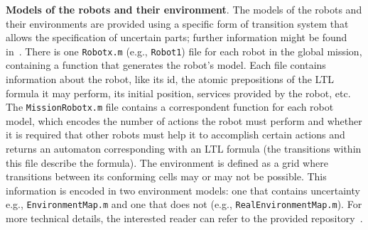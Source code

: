 \textbf{Models of the robots and their environment}. 
The models of the robots and their environments are provided using a specific form of transition system that allows the specification of uncertain parts; further information might be found in~\cite{menghi2018multi}.
There is one \texttt{Robotx.m} (e.g., \texttt{Robot1}) file for each robot in the global mission, containing a function that generates the robot's model.
Each file contains information about the robot, like its id, the atomic prepositions of the LTL formula it may perform, its initial position, services provided by the robot, etc.
The  \texttt{MissionRobotx.m} file contains a correspondent function for each robot model, which
encodes the number of actions the robot must perform and whether it is required that other robots must help it to accomplish certain actions and returns an automaton corresponding with an LTL formula (the transitions within this file describe the formula).
The environment is defined as a grid where transitions between its conforming cells may or may not be possible.
This information is encoded in two environment models: one that contains uncertainty e.g., \texttt{EnvironmentMap.m} and one that does not (e.g., \texttt{RealEnvironmentMap.m}).
For more technical details, the interested reader can refer to the provided repository~\cite{repo}.


